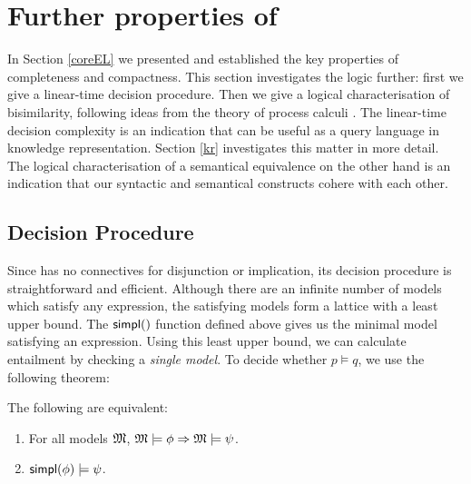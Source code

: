 \section{Further properties of \ELFULL{}}

In Section \ref{coreEL} we presented \ELABR{}
and established the key properties of completeness and compactness.
This section investigates
the logic further: first we give a linear-time decision
procedure. Then we give a logical characterisation of bisimilarity,
following ideas from the theory of process calculi
\cite{HennessyM:alglawfndac}.  The linear-time decision complexity is
an indication that \ELABR{} can be useful as a query language in
knowledge representation. Section \ref{kr} investigates this matter in
more detail. The logical characterisation of a semantical equivalence
on the other hand is an indication that our syntactic and semantical
constructs cohere with each other.

\subsection{Decision Procedure}

\NI Since \ELABR{} has no connectives for disjunction or implication, its
decision procedure is straightforward and efficient.  Although there
are an infinite number of models which satisfy any expression, the
satisfying models form a lattice with a least upper bound.  The $\SIMPL$
function defined above gives us the minimal model satisfying an
expression.  Using this least upper bound, we can calculate entailment
by checking a \emph{single model}.  To decide whether $p \models q$,
we use the following theorem:

\begin{theorem}\label{theorem:decision}
  The following are equivalent:
  \begin{enumerate}
    \item\label{theorem:decision:1} For all models $\frak{M}$,  $\frak{M} \models \phi \Rightarrow \frak{M} \models \psi$.
    \item\label{theorem:decision:2} $\mathsf{simpl}(\phi) \models \psi$.
  \end{enumerate}
\end{theorem}

